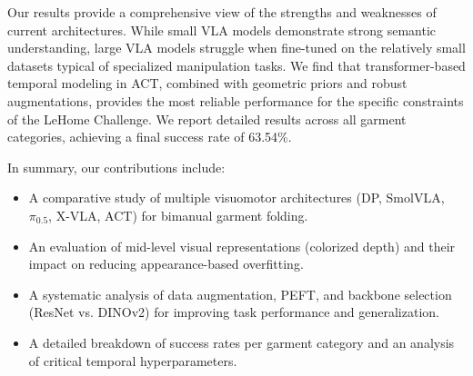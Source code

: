 Our results provide a comprehensive view of the strengths and weaknesses of current architectures. While small VLA models demonstrate strong semantic understanding, large VLA models struggle when fine-tuned on the relatively small datasets typical of specialized manipulation tasks. We find that transformer-based temporal modeling in ACT, combined with geometric priors and robust augmentations, provides the most reliable performance for the specific constraints of the LeHome Challenge. We report detailed results across all garment categories, achieving a final success rate of 63.54\%.

In summary, our contributions include:
\begin{itemize}[leftmargin=*,noitemsep]
    \item A comparative study of multiple visuomotor architectures (DP, SmolVLA, $\pi_{0.5}$, X-VLA, ACT) for bimanual garment folding.
    \item An evaluation of mid-level visual representations (colorized depth) and their impact on reducing appearance-based overfitting.
    \item A systematic analysis of data augmentation, PEFT, and backbone selection (ResNet vs. DINOv2) for improving task performance and generalization.
    \item A detailed breakdown of success rates per garment category and an analysis of critical temporal hyperparameters.
\end{itemize}
    
